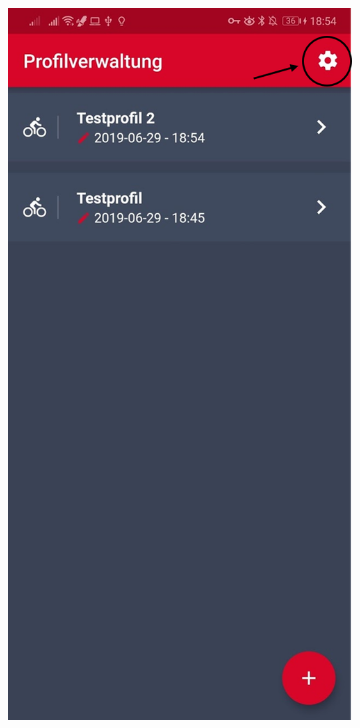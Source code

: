 \begin{figure}[H]
	\centering
	\begin{subfigure}[b]{0.3\textwidth}
		\centering
		\includegraphics[width=1\textwidth]{../include/images/settings/Open_Settings_01}

\end{subfigure}
\end{figure}

